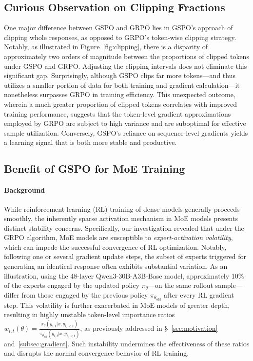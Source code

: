 \subsection{Curious Observation on Clipping Fractions}

One major difference between GSPO and GRPO lies in GSPO’s approach of clipping whole responses, as opposed to GRPO’s token-wise clipping strategy. Notably, as illustrated in Figure~\ref{fig:clipping}, there is a disparity of approximately two orders of magnitude between the proportions of clipped tokens under GSPO and GRPO. Adjusting the clipping intervals does not eliminate this significant gap. Surprisingly, although GSPO clips far more tokens—and thus utilizes a smaller portion of data for both training and gradient calculation—it nonetheless surpasses GRPO in training efficiency. This unexpected outcome, wherein a much greater proportion of clipped tokens correlates with improved training performance, suggests that the token-level gradient approximations employed by GRPO are subject to high variance and are suboptimal for effective sample utilization. Conversely, GSPO’s reliance on sequence-level gradients yields a learning signal that is both more stable and productive.

\subsection{Benefit of GSPO for MoE Training}
\label{subsec:routing_replay}

\paragraph{Background}
While reinforcement learning (RL) training of dense models generally proceeds smoothly, the inherently sparse activation mechanism in MoE models presents distinct stability concerns. Specifically, our investigation revealed that under the GRPO algorithm, MoE models are susceptible to \textit{expert-activation volatility}, which can impede the successful convergence of RL optimization. Notably, following one or several gradient update steps, the subset of experts triggered for generating an identical response often exhibits substantial variation. As an illustration, using the 48-layer Qwen3-30B-A3B-Base model, approximately 10\% of the experts engaged by the updated policy $\pi_{\theta}$—on the same rollout sample—differ from those engaged by the previous policy $\pi_{\theta_\text{old}}$ after every RL gradient step. This volatility is further exacerbated in MoE models of greater depth, resulting in highly unstable token-level importance ratios $w_{i,t}(\theta) = \frac{ \pi_{\theta} (y_{i,t} | x, y_{i,<t}) }{ \pi_{\theta_\text{old}} (y_{i,t} | x,y_{i,<t})}$, as previously addressed in \S~\ref{sec:motivation} and~\ref{subsec:gradient}. Such instability undermines the effectiveness of these ratios and disrupts the normal convergence behavior of RL training.

